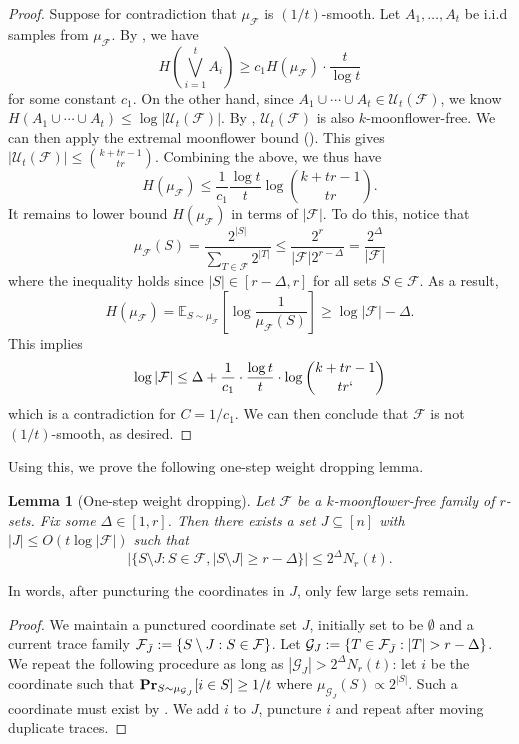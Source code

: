 \documentclass{article}
\newtheorem{lemma}[lemma]{Lemma}
\renewcommand{\Pr}{\mathop{\bf Pr\/}}
\newcommand{\<}{\langle}
\renewcommand{\>}{\rangle}
\newcommand{\calF}{\mathcal{F}}
\newcommand{\calG}{\mathcal{G}}
\newcommand{\calU}{\mathcal{U}}
\newcommand{\E}{\mathbb{E}}
\begin{document}
{\begin{proof}
    Suppose for contradiction that $\mu_{\calF}$ is $(1/t)$-smooth. Let $A_1,\ldots,A_t$ be i.i.d samples from $\mu_{\calF}$. By , we have
    \[
     H \left(\bigvee_{i=1}^t A_i \right) \geq c_1 H(\mu_{\calF}) \cdot \frac{t}{\log t}
    \]for some constant $c_1$. On the other hand, since $A_1 \cup \cdots \cup A_t \in \calU_t (\calF)$, we know $H(A_1 \cup \cdots \cup A_t) \leq \log |\calU_t (\calF)|$. By , $\calU_t (\calF)$ is also $k$-moonflower-free. We can then apply the extremal moonflower bound (). This gives $|\calU_t (\calF)| \leq \binom{k+tr-1}{tr}$. Combining the above, we thus have
    \[
    H(\mu_{\calF}) \leq \frac{1}{c_1} \frac{\log t}{t} \log \binom{k+tr-1}{tr}.
    \]
    It remains to lower bound $H(\mu_{\calF})$ in terms of $|\calF|$. To do this, notice that 
    \[
    \mu_{\calF}(S) = \frac{2^{|S|}}{ \sum_{T \in \calF}2^{|T|}} \leq \frac{2^r}{|\calF|2^{r-\Delta}} = \frac{2^{\Delta}}{|\calF|}
    \]
    where the inequality holds since $|S| \in [r-\Delta, r]$ for all sets $S \in \calF$. As a result,
    \[
    H(\mu_{\calF}) = \E_{S \sim \mu_{\calF}}\left[\log \frac{1}{\mu_{\calF}(S)}\right] \geq \log |\calF| - \Delta.
    \]
    This implies 
    \[
    \log |\calF| \leq \Delta + \frac{1}{c_1} \cdot \frac{\log t}{t} \cdot \log \binom{k+tr-1}{tr`}
    \]
    which is a contradiction for $C = 1/c_1$. We can then conclude that $\calF$ is not $(1/t)$-smooth, as desired.
\end{proof}

Using this, we prove the following one-step weight dropping lemma.

\begin{lemma}[One-step weight dropping]\label{lem:one-step-weight-dropping}
    Let $\calF$ be a $k$-moonflower-free family of $r$-sets. Fix some $\Delta \in [1, r]$. Then there exists a set $J \subseteq [n]$ with $|J| \leq O(t \log |\calF|)$ such that 
    \begin{equation}\label{eqn:one-step-weight-dropping}
        |\{S \setminus J: S \in \calF, |S \setminus J| \geq r - \Delta\}| \leq 2^{\Delta} N_r (t). 
    \end{equation}
\end{lemma}
In words, after puncturing the coordinates in $J$, only few large sets remain.

\begin{proof}
    We maintain a punctured coordinate set $J$, initially set to be $\emptyset$ and a current trace family $\calF_{\Bar{J}}:= \{S \setminus J: S \in \calF\}$. Let $\calG_J: = \{T \in \calF_{\Bar{J}}: |T| > r - \Delta\}$. We repeat the following procedure as long as $|\calG_J| > 2^{\Delta} N_r (t)$: let $i$ be the coordinate such that $\Pr_{S \sim \mu_{\calG_J}}[i \in S] \geq 1/t$ where $\mu_{\calG_J}(S) \propto 2^{|S|}$. Such a coordinate must exist by . We add $i$ to $J$, puncture $i$ and repeat after moving duplicate traces.


\end{proof}}
\end{document}
